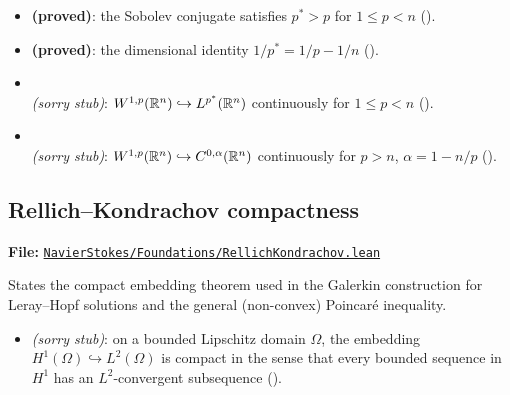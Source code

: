 \begin{itemize}
  \item {} \textbf{(proved)}: the
    Sobolev conjugate satisfies $p^{*} > p$ for $1 \le p < n$
    ().
  \item {} \textbf{(proved)}: the
    dimensional identity $1/p^{*} = 1/p - 1/n$
    ().
  \item {}\\
    \emph{(\textit{sorry} stub)}: $W^{1,p}(\mathbb{R}^{n}) \hookrightarrow
    L^{p^{*}}(\mathbb{R}^{n})$ continuously for $1 \le p < n$
    ().
  \item {}\\
    \emph{(\textit{sorry} stub)}: $W^{1,p}(\mathbb{R}^{n}) \hookrightarrow
    C^{0,\alpha}(\mathbb{R}^{n})$ continuously for $p > n$, $\alpha = 1 - n/p$
    ().
\end{itemize}

\subsection{Rellich--Kondrachov compactness}\label{sec:lean-ch1-rellich}

\textbf{File:}
\href{https://github.com/alejandro-soto-franco/navier-stokes/blob/master/lean/NavierStokes/Foundations/RellichKondrachov.lean}%
{\texttt{NavierStokes/Foundations/RellichKondrachov.lean}}

\medskip\noindent
States the compact embedding theorem used in the Galerkin construction for
Leray--Hopf solutions and the general (non-convex) Poincar\'{e} inequality.

\begin{itemize}
  \item {} \emph{(\textit{sorry} stub)}:
    on a bounded Lipschitz domain $\Omega$, the embedding $H^{1}(\Omega)
    \hookrightarrow L^{2}(\Omega)$ is compact in the sense that every bounded
    sequence in $H^{1}$ has an $L^{2}$-convergent subsequence
    ().
\end{itemize}

